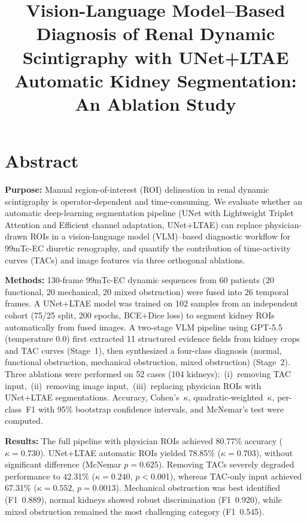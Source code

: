 \documentclass[sn-basic]{sn-jnl}
\title[VLM-based diagnosis with automatic ROI segmentation]{%
  Vision-Language Model–Based Diagnosis of Renal Dynamic
  Scintigraphy with UNet+LTAE Automatic Kidney Segmentation:
  An Ablation Study}
\author*[1]{\fnm{Xiaoxiao} \sur{Zhang}}
\author[1]{\fnm{Anonymous} \sur{Author}}
\author[1]{\fnm{Anonymous} \sur{Author}}
\affil*[1]{%
  \org{Department of Nuclear Medicine, XXX Hospital}, %
  \org{\city{XXX City}, \country{China}}%
}
\begin{document}
\maketitle

\section*{Abstract}

\textbf{Purpose:}
Manual region-of-interest (ROI) delineation in renal dynamic
scintigraphy is operator-dependent and time-consuming.  We
evaluate whether an automatic deep-learning segmentation
pipeline (UNet with Lightweight Triplet Attention and
Efficient channel adaptation, UNet+LTAE) can replace
physician-drawn ROIs in a vision-language model (VLM)–based
diagnostic workflow for 99mTc-EC diuretic renography, and
quantify the contribution of time-activity curves (TACs) and
image features via three orthogonal ablations.

\textbf{Methods:}
130-frame 99mTc-EC dynamic sequences from 60 patients (20
functional, 20 mechanical, 20 mixed obstruction) were fused
into 26 temporal frames.  A UNet+LTAE model was trained on
102 samples from an independent cohort (75/25 split, 200
epochs, BCE+Dice loss) to segment kidney ROIs automatically
from fused images.  A two-stage VLM pipeline using GPT-5.5
(temperature 0.0) first extracted 11 structured evidence
fields from kidney crops and TAC curves (Stage~1), then
synthesized a four-class diagnosis (normal, functional
obstruction, mechanical obstruction, mixed obstruction)
(Stage~2).  Three ablations were performed on 52 cases (104
kidneys):~(i)~removing TAC input,~(ii)~removing image
input,~(iii)~replacing physician ROIs with UNet+LTAE
segmentations.  Accuracy, Cohen's~$\kappa$,
quadratic-weighted~$\kappa$, per-class~F1 with 95\%
bootstrap confidence intervals, and McNemar's test were
computed.

\textbf{Results:}
The full pipeline with physician ROIs achieved 80.77\%
accuracy ($\kappa=0.730$).  UNet+LTAE automatic ROIs yielded
78.85\% ($\kappa=0.703$), without significant difference
(McNemar $p=0.625$).  Removing TACs severely degraded
performance to 42.31\% ($\kappa=0.240$, $p<$0.001), whereas
TAC-only input achieved 67.31\% ($\kappa=0.552$,
$p=0.0013$).  Mechanical obstruction was best identified
(F1~0.889), normal kidneys showed robust discrimination
(F1~0.920), while mixed obstruction remained the most
challenging category (F1~0.545).
\end{document}
